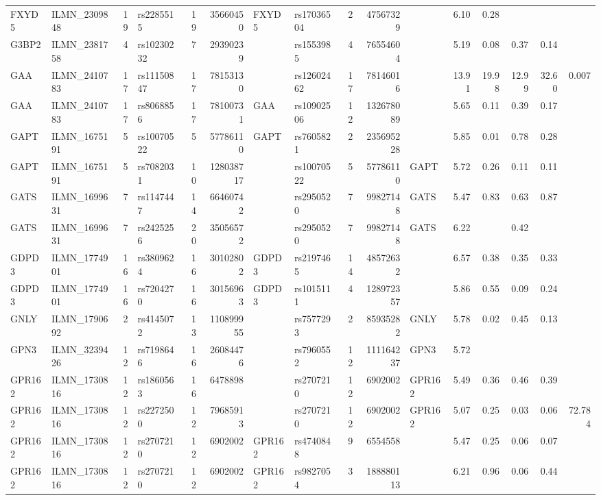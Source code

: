 \documentclass{article}
\begin{document}
\begin{landscape}
{\begin{ThreePartTable}
\begin{longtable}{|llr|lrrl|lrrl|rrrr|r|}
  FXYD5 & ILMN\_2309848 & 19 & rs2285515 & 19 & 35660450 & FXYD5 & rs17036504 & 2 & 47567329 &  & 6.10 & 0.28 &  &  &  \\
  G3BP2 & ILMN\_2381758 & 4 & rs10230232 & 7 & 29390239 &  & rs1553985 & 4 & 76554604 &  & 5.19 & 0.08 & 0.37 & 0.14 &  \\
  GAA & ILMN\_2410783 & 17 & rs11150847 & 17 & 78153130 &  & rs12602462 & 17 & 78146016 &  & 13.91 & 19.98 & 12.99 & 32.60 & 0.007 \\
  GAA & ILMN\_2410783 & 17 & rs8068856 & 17 & 78100731 & GAA & rs10902506 & 12 & 132678089 &  & 5.65 & 0.11 & 0.39 & 0.17 &  \\
  GAPT & ILMN\_1675191 & 5 & rs10070522 & 5 & 57786110 & GAPT & rs7605821 & 2 & 235695228 &  & 5.85 & 0.01 & 0.78 & 0.28 &  \\
  GAPT & ILMN\_1675191 & 5 & rs7082031 & 10 & 128038717 &  & rs10070522 & 5 & 57786110 & GAPT & 5.72 & 0.26 & 0.11 & 0.11 &  \\
  GATS & ILMN\_1699631 & 7 & rs1147447 & 14 & 66460742 &  & rs2950520 & 7 & 99827148 & GATS & 5.47 & 0.83 & 0.63 & 0.87 &  \\
  GATS & ILMN\_1699631 & 7 & rs2425256 & 20 & 35056572 &  & rs2950520 & 7 & 99827148 & GATS & 6.22 &  & 0.42 &  &  \\
  GDPD3 & ILMN\_1774901 & 16 & rs3809624 & 16 & 30102802 & GDPD3 & rs2197465 & 14 & 48572632 &  & 6.57 & 0.38 & 0.35 & 0.33 &  \\
  GDPD3 & ILMN\_1774901 & 16 & rs7204270 & 16 & 30156963 & GDPD3 & rs1015111 & 4 & 128972357 &  & 5.86 & 0.55 & 0.09 & 0.24 &  \\
  GNLY & ILMN\_1790692 & 2 & rs4145072 & 13 & 110899955 &  & rs7577293 & 2 & 85935282 & GNLY & 5.78 & 0.02 & 0.45 & 0.13 &  \\
  GPN3 & ILMN\_3239426 & 12 & rs7198646 & 16 & 26084476 &  & rs7960552 & 12 & 111164237 & GPN3 & 5.72 &  &  &  &  \\
  GPR162 & ILMN\_1730816 & 12 & rs1860563 & 16 & 6478898 &  & rs2707210 & 12 & 6902002 & GPR162 & 5.49 & 0.36 & 0.46 & 0.39 &  \\
  GPR162 & ILMN\_1730816 & 12 & rs2272500 & 12 & 79685913 &  & rs2707210 & 12 & 6902002 & GPR162 & 5.07 & 0.25 & 0.03 & 0.06 & 72.784 \\
  GPR162 & ILMN\_1730816 & 12 & rs2707210 & 12 & 6902002 & GPR162 & rs4740848 & 9 & 6554558 &  & 5.47 & 0.25 & 0.06 & 0.07 &  \\
  GPR162 & ILMN\_1730816 & 12 & rs2707210 & 12 & 6902002 & GPR162 & rs9827054 & 3 & 188880113 &  & 6.21 & 0.96 & 0.06 & 0.44 &  \\

\end{longtable}
\end{ThreePartTable}}
\end{landscape}
\end{document}
